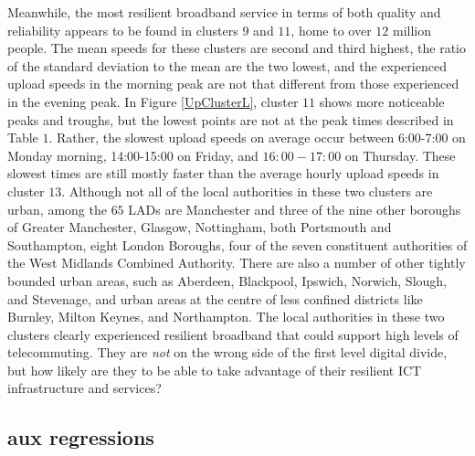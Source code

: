 \documentclass[]{interact}
\theoremstyle{plain}%
\theoremstyle{definition}
\theoremstyle{remark}
\begin{document}
Meanwhile, the most resilient broadband service in terms of both quality
and reliability appears to be found in clusters \(9\) and \(11\), home
to over \(12\) million people. The mean speeds for these clusters are
second and third highest, the ratio of the standard deviation to the
mean are the two lowest, and the experienced upload speeds in the
morning peak are not that different from those experienced in the
evening peak. In Figure \ref{UpClusterL}, cluster \(11\) shows more
noticeable peaks and troughs, but the lowest points are not at the peak
times described in Table \(1\). Rather, the slowest upload speeds on
average occur between 6:00-7:00 on Monday morning, 14:00-15:00 on
Friday, and \(16:00-17:00\) on Thursday. These slowest times are still
mostly faster than the average hourly upload speeds in cluster \(13\).
Although not all of the local authorities in these two clusters are
urban, among the \(65\) LADs are Manchester and three of the nine other
boroughs of Greater Manchester, Glasgow, Nottingham, both Portsmouth and
Southampton, eight London Boroughs, four of the seven constituent
authorities of the West Midlands Combined Authority. There are also a
number of other tightly bounded urban areas, such as Aberdeen,
Blackpool, Ipswich, Norwich, Slough, and Stevenage, and urban areas at
the centre of less confined districts like Burnley, Milton Keynes, and
Northampton. The local authorities in these two clusters clearly
experienced resilient broadband that could support high levels of
telecommuting. They are \emph{not} on the wrong side of the first level
digital divide, but how likely are they to be able to take advantage of
their resilient ICT infrastructure and services?

\hypertarget{sec:4.2}{%
\subsection{aux regressions}\label{sec:4.2}}
\end{document}
